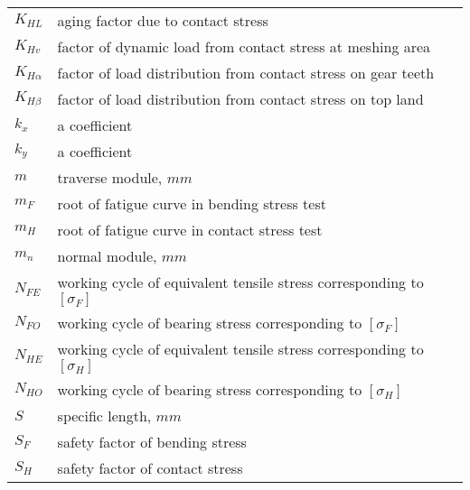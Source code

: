 \begin{tabular}[t]{lp{6.5cm}}
	$ K_{HL} $ & aging factor due to contact stress\\
	$ K_{Hv} $ & factor of dynamic load from contact stress at meshing area\\
	$ K_{H\alpha} $ & factor of load distribution from contact stress on gear teeth\\
	$ K_{H\beta} $ & factor of load distribution from contact stress on top land\\
	$ k_x $ & a coefficient\\
	$ k_y $ & a coefficient\\
	$ m $ & traverse module, $ \unit{mm} $\\
	$ m_F $ & root of fatigue curve in bending stress test\\
	$ m_H $ & root of fatigue curve in contact stress test\\
	$ m_n $ & normal module, $ \unit{mm} $\\
	$ N_{FE} $ & working cycle of equivalent tensile stress corresponding to $ [\sigma_F] $\\
	$ N_{FO} $ & working cycle of bearing stress corresponding to $ [\sigma_F] $\\
	$ N_{HE} $ & working cycle of equivalent tensile stress corresponding to $ [\sigma_H] $\\
	$ N_{HO} $ & working cycle of bearing stress corresponding to $ [\sigma_H] $\\
	$ S $ & specific length, $ \unit{mm} $\\
	$ S_F $ & safety factor of bending stress\\
	$ S_H $ & safety factor of contact stress\\
\end{tabular}
